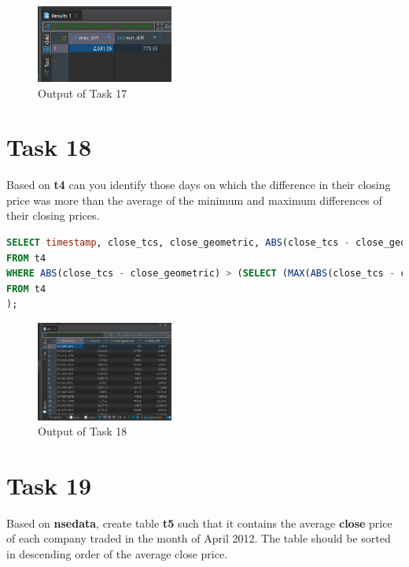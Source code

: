 \documentclass{article}
\begin{document}
\begin{figure}[H]
	\centering
	\includegraphics[width=0.4\textwidth]{Images/Task17.png}
	\caption{Output of Task 17}
\end{figure}

\section*{Task 18}

\begin{task*}[18]
Based on \textbf{t4} can you identify those days on which the difference in their closing price was more than the average of the minimum and maximum differences of their closing prices.
\end{task*}

\begin{lstlisting}[language=SQL, caption=Identifying Days with Closing Price Difference More than Average]
SELECT timestamp, close_tcs, close_geometric, ABS(close_tcs - close_geometric) AS daily_diff
FROM t4
WHERE ABS(close_tcs - close_geometric) > (SELECT (MAX(ABS(close_tcs - close_geometric)) + MIN(ABS(close_tcs - close_geometric))) / 2
FROM t4
);
\end{lstlisting}

\begin{figure}[H]
	\centering
	\includegraphics[width=0.4\textwidth]{Images/Task18.png}
	\caption{Output of Task 18}
\end{figure}

\section*{Task 19}

\begin{task*}[19]
Based on \textbf{nsedata}, create table \textbf{t5} such that it contains the average \textbf{close} price of each company traded in the month of April 2012. The table should be sorted in descending order of the average close price.
\end{task*}
\end{document}
